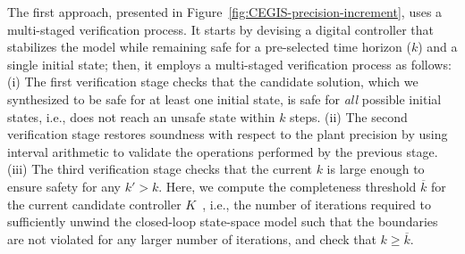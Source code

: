 \documentclass[10pt,conference]{IEEEtran}
\begin{document}
The first approach, presented in Figure~\ref{fig:CEGIS-precision-increment}, 
uses a multi-staged verification process. 
It starts by devising a digital controller that stabilizes the model while remaining safe for a
pre-selected time horizon ($k$) and a single initial state; then, it
employs a multi-staged verification process as follows:
(i) The first verification stage checks that the candidate
solution, which we synthesized to be safe for at least one initial
state, is safe for \emph{all} possible initial states, i.e., does not reach
an unsafe state within $k$ steps.
(ii) The second verification stage 
 restores soundness with respect to the plant precision
by using interval arithmetic \cite{moore1966interval} to validate the 
operations performed by the previous stage. 
(iii) The third verification stage checks that the current
$k$ is large enough to ensure safety for any $k'{>}k$.  Here, we compute the
completeness threshold $\overline{k}$ for the current candidate controller 
$K$~\cite{abatecav2017}, i.e., the number of
iterations required to sufficiently unwind the closed-loop state-space
model such that the boundaries are not violated for any larger number of
iterations, and
check that $k{\geq}\overline{k}$.
\end{document}
